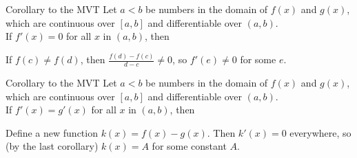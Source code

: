\begin{frame}[t]
\begin{block}{Corollary to the MVT}
Let $a<b$ be numbers in the domain of $f(x)$ and $g(x)$, which are continuous over $[a,b]$ and differentiable over $(a,b)$.\\[1em]
\vfill\color{C1}
If $f'(x)=0$ for all $x$ in $(a,b)$, then \pause
\iftoggle{printsolutions}{\alert{$f(x)$ is constant in that interval. That is, $f(c)=f(d)$ for all $c,d$ in $[a,b]$.}}{\\[2em]~ }
\end{block}\vfill

\parbox{.3\textwidth}{
}
\color{answercolor}
\parbox{.6\textwidth}{
If $f(c) \neq f(d)$, then $\frac{f(d)-f(c)}{d-c} \neq 0$, so $f'(e) \neq 0$ for some $e$.
}\vfill

\end{frame}
\begin{frame}[t]
\begin{block}{Corollary to the MVT}
Let $a<b$ be numbers in the domain of $f(x)$ and $g(x)$, which are continuous over $[a,b]$ and differentiable over $(a,b)$.\\[1em]
\vfill\color{C1}
 If $f'(x)=g'(x)$ for all $x$ in $(a,b)$, then \pause
\iftoggle{printsolutions}{\alert{$f(x)=g(x)+A$ for some constant value $A$.}}{\\[2em]~}
\end{block}
\vfill
\parbox{.3\textwidth}{
}
\color{answercolor}\hfill
\parbox{.6\textwidth}{
Define a new function $k(x) = f(x)-g(x)$. Then $k'(x)=0$ everywhere, so (by the last corollary) $k(x)=A$ for some constant $A$.}\vfill
{}
\end{frame}
